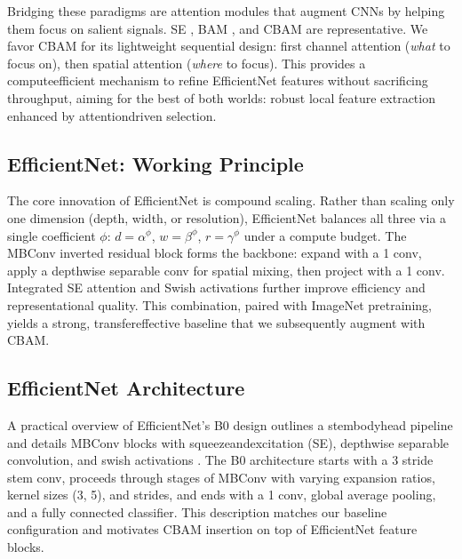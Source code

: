 Bridging these paradigms are attention modules that augment CNNs by helping them focus on salient signals. SE \cite{hu2018squeeze}, BAM \cite{park2018bam}, and CBAM \cite{woo2018cbam} are representative. We favor CBAM for its lightweight sequential design: first channel attention (\textit{what} to focus on), then spatial attention (\textit{where} to focus). This provides a compute\textendash efficient mechanism to refine EfficientNet features without sacrificing throughput, aiming for the best of both worlds: robust local feature extraction enhanced by attention\textendash driven selection.

\subsection{EfficientNet: Working Principle}
The core innovation of EfficientNet \cite{tan2019efficientnet} is compound scaling. Rather than scaling only one dimension (depth, width, or resolution), EfficientNet balances all three via a single coefficient \(\phi\): \(d=\alpha^{\phi}\), \(w=\beta^{\phi}\), \(r=\gamma^{\phi}\) under a compute budget. The MBConv inverted residual block forms the backbone: expand with a 1 conv, apply a depthwise separable conv for spatial mixing, then project with a 1 conv. Integrated SE attention \cite{hu2018squeeze} and Swish activations further improve efficiency and representational quality. This combination, paired with ImageNet pretraining, yields a strong, transfer\textendash effective baseline that we subsequently augment with CBAM.

\subsection{EfficientNet Architecture}
A practical overview of EfficientNet’s B0 design outlines a stem\textendash body\textendash head pipeline and details MBConv blocks with squeeze\textendash and\textendash excitation (SE), depthwise separable convolution, and swish activations \cite{tan2019efficientnet}. The B0 architecture starts with a 3 stride stem conv, proceeds through stages of MBConv with varying expansion ratios, kernel sizes (3, 5), and strides, and ends with a 1 conv, global average pooling, and a fully connected classifier. This description matches our baseline configuration and motivates CBAM insertion on top of EfficientNet feature blocks.

